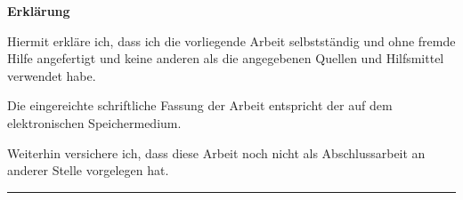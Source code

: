 \begin{titlepage}

  \huge \textbf{Erklärung}

  \vspace{1.5cm}

  \large Hiermit erkläre ich, dass ich die vorliegende Arbeit selbstständig und ohne fremde Hilfe angefertigt und keine anderen als die angegebenen Quellen und Hilfsmittel verwendet habe.

  \vspace{1cm}

  \large Die eingereichte schriftliche Fassung der Arbeit entspricht der auf dem elektronischen Speichermedium.

  \vspace{1cm}

  \large Weiterhin versichere ich, dass diese Arbeit noch nicht als Abschlussarbeit an anderer Stelle vorgelegen hat.

  \vspace{2cm}

  \noindent\rule{8cm}{0.4pt}

\end{titlepage}
